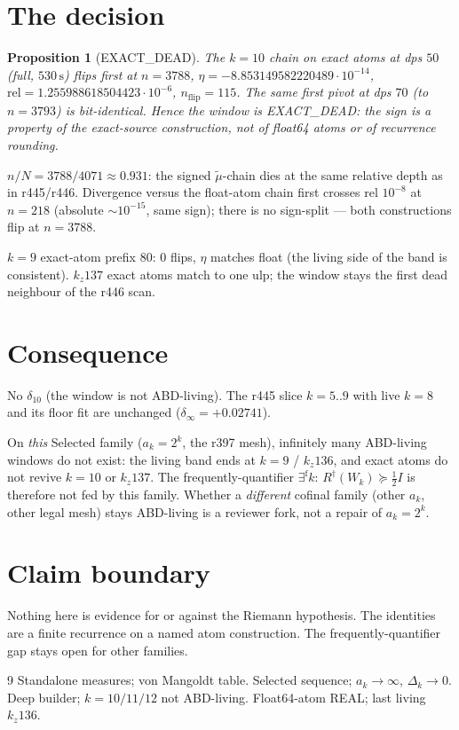 \documentclass[11pt]{article}
\newtheorem{prop}{Proposition}
\begin{document}
\section{The decision}\label{sec:dec}

\begin{prop}[EXACT\_DEAD]\label{prop:dead}
The $k=10$ chain on exact atoms at dps $50$
(full, $530\,\mathrm{s}$) flips first at
$n=3788$,
$\eta=-8.853149582220489\cdot 10^{-14}$,
$\mathrm{rel}=1.255988618504423\cdot 10^{-6}$,
$n_{\mathrm{flip}}=115$.
The same first pivot at dps $70$ (to $n=3793$)
is bit-identical.
Hence the window is EXACT\_DEAD:
the sign is a property of the exact-source
construction, not of float64 atoms or of
recurrence rounding.
\end{prop}

$n/N=3788/4071\approx 0.931$: the signed
$\tilde\mu$-chain dies at the same relative
depth as in r445/r446.
Divergence versus the float-atom chain first
crosses rel $10^{-8}$ at $n=218$
(absolute $\sim 10^{-15}$, same sign);
there is no sign-split --- both constructions
flip at $n=3788$.

$k=9$ exact-atom prefix $80$: $0$ flips, $\eta$
matches float (the living side of the band
is consistent).
$k_z137$ exact atoms match to one ulp; the
window stays the first dead neighbour of the
r446 scan.

\section{Consequence}\label{sec:cons}

No $\delta_{10}$ (the window is not ABD-living).
The r445 slice $k=5..9$ with live $k=8$ and its
floor fit are unchanged
($\delta_\infty=+0.02741$).

On \emph{this} Selected family ($a_k=2^k$,
the r397 mesh), infinitely many ABD-living
windows do not exist: the living band ends
at $k=9$ / $k_z136$, and exact atoms do not
revive $k=10$ or $k_z137$.
The frequently-quantifier
$\exists^{\mathrm{f}}k:\,R^{\dagger}(W_k)\succeq\tfrac12 I$
is therefore not fed by this family.
Whether a \emph{different} cofinal family
(other $a_k$, other legal mesh) stays ABD-living
is a reviewer fork, not a repair of $a_k=2^k$.

\section*{Claim boundary}

Nothing here is evidence for or against the Riemann
hypothesis.
The identities are a finite recurrence on a
named atom construction.
The frequently-quantifier gap stays open for
other families.

\begin{thebibliography}{9}
 Standalone measures; von Mangoldt table.
 Selected sequence; $a_k\to\infty$, $\Delta_k\to 0$.
 Deep builder; $k=10/11/12$ not ABD-living.
 Float64-atom REAL; last living $k_z136$.
\end{thebibliography}
\end{document}
